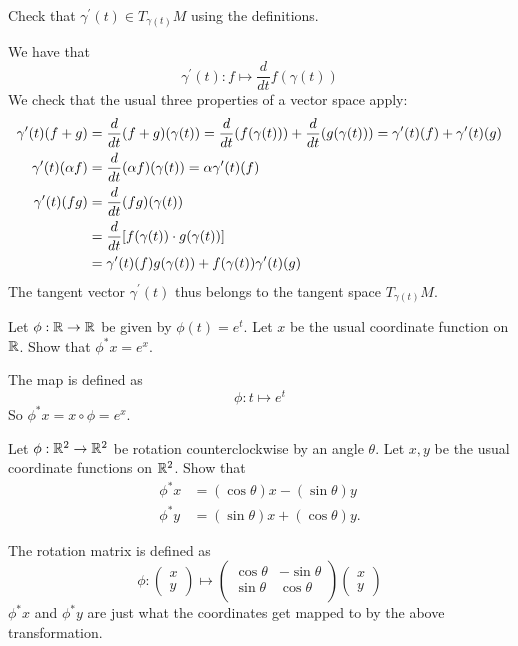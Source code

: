 \documentclass[10pt]{article}
\begin{document}
\begin{example}\label{b1e12}
	Check that $\gamma^\prime(t) \in T_{\gamma(t)}M$ using the definitions.
\end{example}
\sol We have that
$$
	\gamma^\prime(t): f \mapsto \frac{d}{dt}f(\gamma(t))
$$
We check that the usual three properties of a vector space apply:
$$
\begin{aligned}
	\gamma^\prime(t)(f+g) &= \frac{d}{dt}(f+g)(\gamma(t)) = \frac{d}{dt}(f(\gamma(t))) + \frac{d}{dt}(g(\gamma(t))) = \gamma^\prime(t)(f) + \gamma^\prime(t)(g)\\
	\gamma^\prime(t)(\alpha f) &= \frac{d}{dt}(\alpha f)(\gamma(t)) = \alpha \gamma^\prime(t)(f)\\
	\gamma^\prime(t)(fg) &= \frac{d}{dt}(fg)(\gamma(t))\\
	&= \frac{d}{dt}\sparen*{f(\gamma(t)) \cdot g(\gamma(t))}\\
	&= \gamma^\prime(t)(f)g(\gamma(t)) + f(\gamma(t))\gamma^\prime(t)(g)
\end{aligned}
$$
The tangent vector $\gamma^\prime(t)$ thus belongs to the tangent space $T_{\gamma(t)}M$.


\begin{example}
	Let $\phi:\mathbb{R}\to\mathbb{R}$ be given by $\phi(t)=e^t$. Let $x$ be the usual coordinate function on $\mathbb{R}$.
	Show that $\phi^*x=e^x$.
\end{example}
\sol The map is defined as
$$
	\phi: t \mapsto e^t
$$
So $\phi^*x = x \circ \phi = e^x$.


\begin{example}\label{b1e14}
	Let $\phi:\mathbb{R}^2\to\mathbb{R}^2$ be rotation counterclockwise by an angle $\theta$.
	Let $x, y$ be the usual coordinate functions on $\mathbb{R}^2$. Show that
	$$
		\begin{aligned}
			\phi^*x &= (\cos\theta)x - (\sin\theta)y\\
			\phi^*y &= (\sin\theta)x + (\cos\theta)y.
		\end{aligned}
	$$
\end{example}
\sol The rotation matrix is defined as
$$
\phi:\begin{pmatrix}
	x\\y
\end{pmatrix}\mapsto
\begin{pmatrix}
	\cos\theta&-\sin\theta\\
	\sin\theta& \cos\theta\\
\end{pmatrix}
\begin{pmatrix}
	x\\y
\end{pmatrix}
$$
$\phi^*x$ and $\phi^*y$ are just what the coordinates get mapped to by the above transformation.
\end{document}
